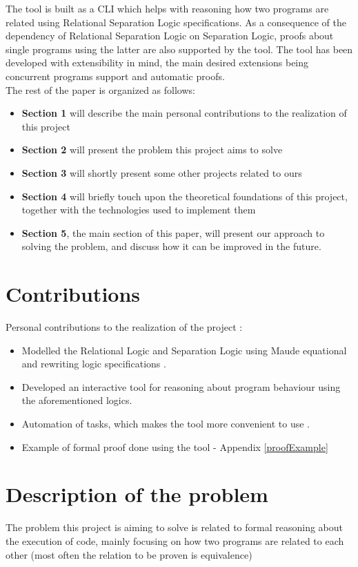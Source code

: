 \documentclass[12pt,a4paper]{article}
\begin{document}
The tool is built as a CLI which helps with reasoning how two programs are related using Relational Separation Logic specifications. As a consequence of the dependency of Relational Separation Logic on Separation Logic, proofs about single programs using the latter are also supported by the tool. The tool has been developed with extensibility in mind, the main desired extensions being concurrent programs support and automatic proofs. \\

The rest of the paper is organized as follows: 
\begin{itemize}
	\item {\textbf{Section 1} will describe the main personal contributions to the realization of this project}
	\item {\textbf{Section 2} will present the problem this project aims to solve}
	\item {\textbf{Section 3} will shortly present some other projects related to ours}
	\item {\textbf{Section 4} will briefly touch upon the theoretical foundations of this project, together with the technologies used to implement them}
	\item {\textbf{Section 5}, the main section of this paper, will present our approach to solving the problem, and discuss how it can be improved in the future.}
\end{itemize}
\section{Contributions}
Personal contributions to the realization of the project : 
\begin{itemize}
	\item Modelled the Relational Logic and Separation Logic using Maude equational and rewriting logic specifications . 
	\item Developed an interactive tool for reasoning about program behaviour using the aforementioned logics.
	\item Automation of tasks, which makes the tool more convenient to use .
	\item Example of formal proof done using the tool - Appendix \ref{proofExample}
\end{itemize}
\section{Description of the problem}
The problem this project is aiming to solve is related to formal reasoning about the execution of code, mainly focusing on how two programs are related to each other (most often the relation to be proven is equivalence)\\
\end{document}
